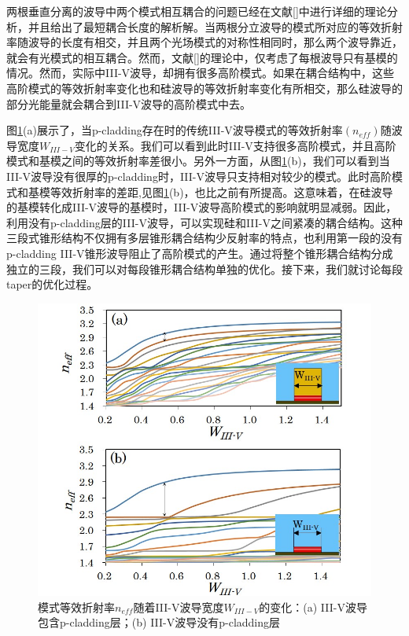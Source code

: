 两根垂直分离的波导中两个模式相互耦合的问题已经在文献[]中进行详细的理论分析，并且给出了最短耦合长度的解析解。当两根分立波导的模式所对应的等效折射率随波导的长度有相交，并且两个光场模式的对称性相同时，那么两个波导靠近，就会有光模式的相互耦合。然而，文献[]的理论中，仅考虑了每根波导只有基模的情况。然而，实际中III-V波导，却拥有很多高阶模式。如果在耦合结构中，这些高阶模式的等效折射率变化也和硅波导的等效折射率变化有所相交，那么硅波导的部分光能量就会耦合到III-V波导的高阶模式中去。

图\ref{fig_ch3_multimode}(a)展示了，当p-cladding存在时的传统III-V波导模式的等效折射率$(n_{eff})$随波导宽度$W_{III-V}$变化的关系。我们可以看到此时III-V支持很多高阶模式，并且高阶模式和基模之间的等效折射率差很小。另外一方面，从图\ref{fig_ch3_multimode}(b)，我们可以看到当III-V波导没有很厚的p-cladding时，III-V波导只支持相对较少的模式。此时高阶模式和基模等效折射率的差距,见图\ref{fig_ch3_multimode}(b)，也比之前有所提高。这意味着，在硅波导的基模转化成III-V波导的基模时，III-V波导高阶模式的影响就明显减弱。因此，利用没有p-cladding层的III-V波导，可以实现硅和III-V之间紧凑的耦合结构。这种三段式锥形结构不仅拥有多层锥形耦合结构少反射率的特点\cite{kurczveil2013characterization}，也利用第一段的没有p-cladding III-V锥形波导阻止了高阶模式的产生。通过将整个锥形耦合结构分成独立的三段，我们可以对每段锥形耦合结构单独的优化。接下来，我们就讨论每段taper的优化过程。

\begin{figure}[htb]
	\centering
	\includegraphics[width=12cm]{./Pictures/fig_ch3_multimode.jpg}
	\caption{模式等效折射率$n_{eff}$随着III-V波导宽度$W_{III-V}$的变化：(a) III-V波导包含p-cladding层；(b) III-V波导没有p-cladding层}
	\label{fig_ch3_multimode}
\end{figure}

